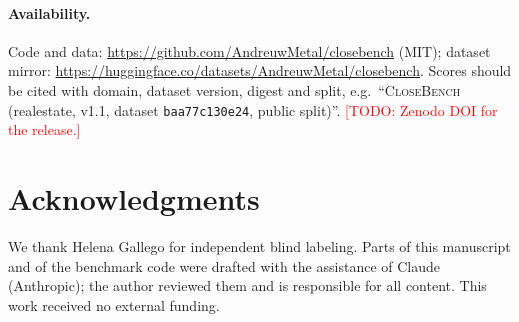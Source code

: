 \documentclass[11pt]{article}
\newcommand{\TODO}[1]{\textcolor{red}{[TODO: #1]}}
\newcommand{\cb}{\textsc{CloseBench}}
\newcommand{\code}[1]{\texttt{#1}}
\begin{document}
\paragraph{Availability.} Code and data: \url{https://github.com/AndreuwMetal/closebench} (MIT);
dataset mirror: \url{https://huggingface.co/datasets/AndreuwMetal/closebench}.
Scores should be cited with domain, dataset version, digest and split, e.g.\ ``\cb{} (realestate, v1.1,
dataset \code{baa77c130e24}, public split)''.
\TODO{Zenodo DOI for the release.}

\section*{Acknowledgments}
We thank Helena Gallego for independent blind labeling. Parts of this manuscript and of the benchmark
code were drafted with the assistance of Claude (Anthropic); the author reviewed them and is responsible
for all content. This work received no external funding.



\end{document}
